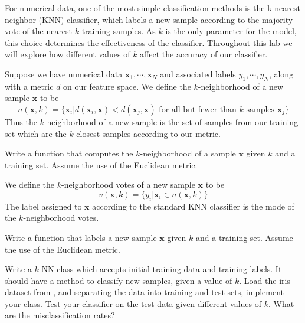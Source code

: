 
For numerical data, one of the most simple classification methods is the k-nearest neighbor (KNN) classifier, which labels a new sample according to the majority vote of the nearest $k$ training samples. As $k$ is the only parameter for the model, this choice determines the effectiveness of the classifier. Throughout this lab we will explore how different values of $k$ affect the accuracy of our classifier.

Suppose we have numerical data $\mathbf{x}_{1}, \cdots, \mathbf{x}_{N}$ and associated labels $y_{1}, \cdots, y_{N}$, along with a metric $d$ on our feature space. We define the $k$-neighborhood of a new sample $\mathbf{x}$ to be
\begin{equation*}
n(\mathbf{x},k) = \{\mathbf{x}_{i} | d(\mathbf{x}_{i}, \mathbf{x}) < d(\mathbf{x}_{j}, \mathbf{x}) \text{ for all but fewer than } k \text{ samples } \mathbf{x}_{j}\}
\end{equation*}
Thus the $k$-neighborhood of a new sample is the set of samples from our training set which are the $k$ closest samples according to our metric.

\begin{problem}
Write a function that computes the $k$-neighborhood of a sample $\mathbf{x}$ given $k$ and a training set. Assume the use of the Euclidean metric.
\end{problem}

We define the $k$-neighborhood votes of a new sample $\mathbf{x}$ to be
\begin{equation*}
v(\mathbf{x},k) = \{y_{i} | \mathbf{x}_{i} \in n(\mathbf{x},k)\}
\end{equation*}
The label assigned to $\mathbf{x}$ according to the standard KNN classifier is the mode of the $k$-neighborhood votes.

\begin{problem}
Write a function that labels a new sample $\mathbf{x}$ given $k$ and a training set. Assume the use of the Euclidean metric.
\end{problem}

\begin{problem}
Write a $k$-NN class which accepts initial training data and training labels. It should have a method to classify new samples, given a value of $k$. Load the iris dataset from , and separating the data into training and test sets, implement your class. Test your classifier on the test data given different values of $k$. What are the misclassification rates?
\end{problem}


